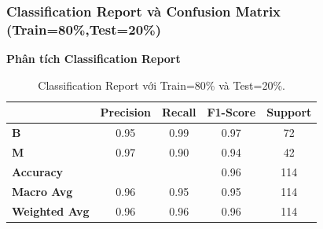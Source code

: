 \newpage

\subsubsection{Classification Report và Confusion Matrix (Train=80\%,Test=20\%)}

\textbf{Phân tích Classification Report}

\begin{table}[h!]
	\centering
	\begin{tabular}{|l|c|c|c|c|}
		\hline
		\textbf{} & \textbf{Precision} & \textbf{Recall} & \textbf{F1-Score} & \textbf{Support} \\ \hline
		\textbf{B} & 0.95 & 0.99 & 0.97 & 72 \\ \hline
		\textbf{M} & 0.97 & 0.90 & 0.94 & 42 \\ \hline
		\textbf{Accuracy} & \multicolumn{2}{c|}{} & 0.96 & 114 \\ \hline
		\textbf{Macro Avg} & 0.96 & 0.95 & 0.95 & 114 \\ \hline
		\textbf{Weighted Avg} & 0.96 & 0.96 & 0.96 & 114 \\ \hline
	\end{tabular}
	\caption{Classification Report với Train=80\% và Test=20\%.}
\end{table}

